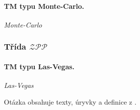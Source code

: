\paragraph{TM typu Monte-Carlo.} \textit{Monte-Carlo}

\subsubsection*{Třída $\mathcal{ZPP}$}

\paragraph{TM typu Las-Vegas.} \textit{Las-Vegas}

Otázka obsahuje texty, úryvky a definice z \cite{tal:demlova}.
